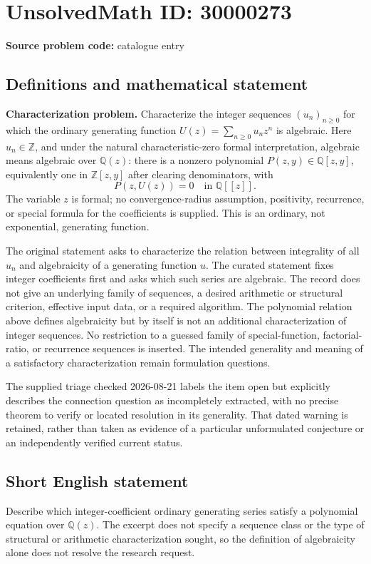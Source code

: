 \documentclass[11pt]{article}
\newcommand{\Z}{\mathbb{Z}}
\newcommand{\Q}{\mathbb{Q}}
\begin{document}
\section*{UnsolvedMath ID: 30000273}
\textbf{Source problem code:} catalogue entry
\subsection{Definitions and mathematical statement}
\textbf{Characterization problem.} Characterize the integer sequences \((u_n)_{n\ge0}\) for which the ordinary generating function \(U(z)=\sum_{n\ge0}u_nz^n\) is algebraic. Here \(u_n\in\Z\), and under the natural characteristic-zero formal interpretation, algebraic means algebraic over \(\Q(z)\): there is a nonzero polynomial \(P(z,y)\in\Q[z,y]\), equivalently one in \(\Z[z,y]\) after clearing denominators, with\[P(z,U(z))=0\quad\text{in }\Q[[z]].\] The variable \(z\) is formal; no convergence-radius assumption, positivity, recurrence, or special formula for the coefficients is supplied. This is an ordinary, not exponential, generating function.\par The original statement asks to characterize the relation between integrality of all \(u_n\) and algebraicity of a generating function \(u\). The curated statement fixes integer coefficients first and asks which such series are algebraic. The record does not give an underlying family of sequences, a desired arithmetic or structural criterion, effective input data, or a required algorithm. The polynomial relation above defines algebraicity but by itself is not an additional characterization of integer sequences. No restriction to a guessed family of special-function, factorial-ratio, or recurrence sequences is inserted. The intended generality and meaning of a satisfactory characterization remain formulation questions.\par The supplied triage checked 2026-08-21 labels the item open but explicitly describes the connection question as incompletely extracted, with no precise theorem to verify or located resolution in its generality. That dated warning is retained, rather than taken as evidence of a particular unformulated conjecture or an independently verified current status.
\subsection{Short English statement}
Describe which integer-coefficient ordinary generating series satisfy a polynomial equation over \(\Q(z)\). The excerpt does not specify a sequence class or the type of structural or arithmetic characterization sought, so the definition of algebraicity alone does not resolve the research request.
\end{document}
